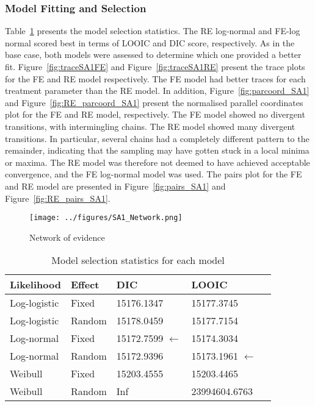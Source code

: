 \subsubsection{Model Fitting and Selection}
Table~\ref{selectStatSA1} presents the model selection statistics. The RE log-normal and FE-log normal scored best in terms of LOOIC and DIC score, respectively. As in the base case, both models were assessed to determine which one provided a better fit. Figure~\ref{fig:traceSA1FE} and Figure~\ref{fig:traceSA1RE} present the trace plots for the FE and RE model respectively. The FE model had better traces for each treatment parameter than the RE model. In addition, Figure~\ref{fig:parcoord_SA1} and Figure~\ref{fig:RE_parcoord_SA1} present the normalised parallel coordinates plot for the FE and RE model, respectively. The FE model showed no divergent transitions, with intermingling chains. The RE model showed many divergent transitions. In particular, several chains had a completely different pattern to the remainder, indicating that the sampling may have gotten stuck in a local minima or maxima. The RE model was therefore not deemed to have achieved acceptable convergence, and the FE log-normal model was used. The pairs plot for the FE and RE model are presented in Figure~\ref{fig:pairs_SA1} and Figure~\ref{fig:RE_pairs_SA1}. \\

\begin{figure}[h]
    \centering
    \texttt{[image: ../figures/SA1\_Network.png]}
    \caption{Network of evidence}
    \label{fig:sa1net}
\end{figure}

\begin{table}[h]
    \centering
    \begin{tabular}{lllll}
    \hline
    Likelihood   & Effect & DIC        & LOOIC         \\ \hline
    Log-logistic & Fixed  & 15176.1347 & 15177.3745    \\
    Log-logistic & Random & 15178.0459 & 15177.7154    \\
    Log-normal   & Fixed  & 15172.7599 $\leftarrow$ & 15174.3034    \\
    Log-normal   & Random & 15172.9396 & 15173.1961 $\leftarrow$   \\
    Weibull      & Fixed  & 15203.4555 & 15203.4465    \\
    Weibull      & Random & Inf        & 23994604.6763 \\ \hline
    \end{tabular}
    \caption{Model selection statistics for each model}
    \label{selectStatSA1}
\end{table}

